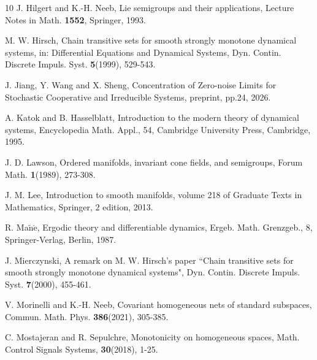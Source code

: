 \documentclass[a4paper,11pt]{article}
\theoremstyle{plain}
\theoremstyle{definition}
\numberwithin{equation}{section}
\begin{document}
\begin{thebibliography}{10}
		J. Hilgert and K.-H. Neeb, \rm{Lie semigroups and their applications},
		Lecture Notes in Math. \textbf{1552}, Springer, 1993.
		
		

		
		
		M. W. Hirsch, \rm{Chain transitive sets for smooth strongly monotone dynamical systems, in: Differential Equations and Dynamical Systems}, Dyn. Contin. Discrete Impuls. Syst. \textbf{5}(1999), 529-543.
		
		J. Jiang, Y. Wang and X. Sheng, \rm{Concentration of Zero-noise Limits for Stochastic Cooperative and Irreducible Systems}, preprint, pp.24, 2026.
		

		A. Katok and B. Hasselblatt, \rm{Introduction to the modern theory of dynamical systems}, Encyclopedia Math. Appl., 54, Cambridge University Press, Cambridge, 1995.
		
		J. D. Lawson, \rm{Ordered manifolds, invariant cone fields, and semigroups},
		Forum Math. \textbf{1}(1989), 273-308.
		
		J. M. Lee, \rm{Introduction to smooth manifolds},
		volume 218 of Graduate Texts in Mathematics, Springer, $2$ edition, 2013.
		
		
		R. Ma$\tilde{\text{n}}\acute{\text{e}}$, \rm{Ergodic theory and differentiable dynamics}, Ergeb. Math. Grenzgeb., 8, Springer-Verlag, Berlin, 1987.
		
		J. Mierczynski, \rm{A remark on M. W. Hirsch's paper ``Chain transitive sets for smooth strongly monotone dynamical systems"}, Dyn. Contin. Discrete Impuls. Syst. \textbf{7}(2000), 455-461.
		
		V. Morinelli and K.-H. Neeb, \rm{Covariant homogeneous nets of standard subspaces},
		Commun. Math. Phys. \textbf{386}(2021), 305-385.
		
		
		C. Mostajeran and R. Sepulchre, \rm{Monotonicity on homogeneous spaces},
		Math. Control Signals Systems, \textbf{30}(2018), 1-25.
		

\end{thebibliography}
\end{document}
